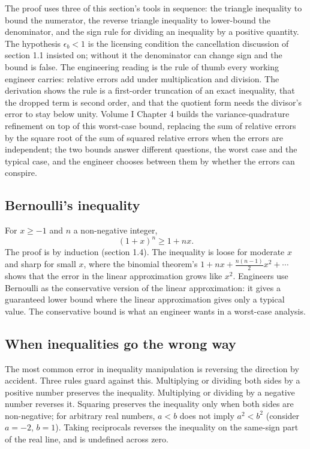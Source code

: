 The proof uses three of this section's tools in sequence: the triangle
inequality to bound the numerator, the reverse triangle inequality to
lower-bound the denominator, and the sign rule for dividing an
inequality by a positive quantity. The hypothesis $\epsilon_{b} < 1$ is
the licensing condition the cancellation discussion of section 1.1
insisted on; without it the denominator can change sign and the bound is
false. The engineering reading is the rule of thumb every working
engineer carries: relative errors add under multiplication and division.
The derivation shows the rule is a first-order truncation of an exact
inequality, that the dropped term is second order, and that the quotient
form needs the divisor's error to stay below unity. Volume I Chapter 4
builds the variance-quadrature refinement on top of this worst-case
bound, replacing the sum of relative errors by the square root of the
sum of squared relative errors when the errors are independent; the two
bounds answer different questions, the worst case and the typical case,
and the engineer chooses between them by whether the errors can conspire.

\subsection{Bernoulli's inequality}

For $x \geq -1$ and $n$ a non-negative integer,
\[
(1 + x)^{n} \geq 1 + nx.
\]
The proof is by induction (section 1.4). The inequality is loose for
moderate $x$ and sharp for small $x$, where the binomial theorem's
$1 + nx + \tfrac{n(n-1)}{2} x^{2} + \cdots$ shows that the error in
the linear approximation grows like $x^{2}$. Engineers use Bernoulli
as the conservative version of the linear approximation: it gives a
guaranteed lower bound where the linear approximation gives only a
typical value. The conservative bound is what an engineer wants in a
worst-case analysis.

\subsection{When inequalities go the wrong way}

The most common error in inequality manipulation is reversing the
direction by accident. Three rules guard against this. Multiplying
or dividing both sides by a positive number preserves the inequality.
Multiplying or dividing by a negative number reverses it. Squaring
preserves the inequality only when both sides are non-negative; for
arbitrary real numbers, $a < b$ does not imply $a^{2} < b^{2}$
(consider $a = -2$, $b = 1$). Taking reciprocals reverses the
inequality on the same-sign part of the real line, and is undefined
across zero.

